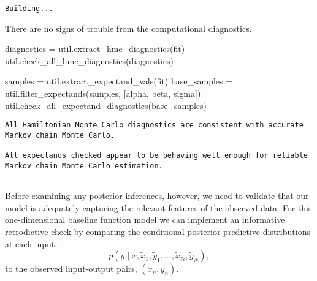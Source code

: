 \documentclass[
  letterpaper,
  DIV=11,
  numbers=noendperiod]{scrartcl}
\newenvironment{Shaded}{\begin{snugshade}}{\end{snugshade}}
\newcommand{\NormalTok}[1]{\textcolor[rgb]{0.00,0.23,0.31}{#1}}
\newcommand{\OperatorTok}[1]{\textcolor[rgb]{0.37,0.37,0.37}{#1}}
\newcommand{\StringTok}[1]{\textcolor[rgb]{0.13,0.47,0.30}{#1}}
\begin{document}
\begin{verbatim}
Building...
\end{verbatim}

There are no signs of trouble from the computational diagnostics.

\begin{Shaded}
\begin{Highlighting}[]
\NormalTok{diagnostics }\OperatorTok{=}\NormalTok{ util.extract\_hmc\_diagnostics(fit)}
\NormalTok{util.check\_all\_hmc\_diagnostics(diagnostics)}

\NormalTok{samples }\OperatorTok{=}\NormalTok{ util.extract\_expectand\_vals(fit)}
\NormalTok{base\_samples }\OperatorTok{=}\NormalTok{ util.filter\_expectands(samples,}
\NormalTok{                                      [}\StringTok{\textquotesingle{}alpha\textquotesingle{}}\NormalTok{, }\StringTok{\textquotesingle{}beta\textquotesingle{}}\NormalTok{, }\StringTok{\textquotesingle{}sigma\textquotesingle{}}\NormalTok{])}
\NormalTok{util.check\_all\_expectand\_diagnostics(base\_samples)}
\end{Highlighting}
\end{Shaded}

\begin{verbatim}
All Hamiltonian Monte Carlo diagnostics are consistent with accurate
Markov chain Monte Carlo.
 
All expectands checked appear to be behaving well enough for reliable
Markov chain Monte Carlo estimation.
 
\end{verbatim}

Before examining any posterior inferences, however, we need to validate
that our model is adequately capturing the relevant features of the
observed data. For this one-dimensional baseline function model we can
implement an informative retrodictive check by comparing the conditional
posterior predictive distributions at each input, \[
p(y \mid x,
         \tilde{x}_{1}, \tilde{y}_{1}, \ldots, \tilde{x}_{N}, \tilde{y}_{N}),
\] to the observed input-output pairs, \((x_{n}, y_{n})\).
\end{document}
